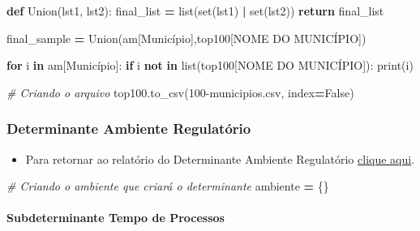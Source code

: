\documentclass[
  12,
  dvipsnames]{article}
\newenvironment{Shaded}{\begin{snugshade}}{\end{snugshade}}
\newcommand{\BuiltInTok}[1]{#1}
\newcommand{\CommentTok}[1]{\textcolor[rgb]{0.56,0.35,0.01}{\textit{#1}}}
\newcommand{\ControlFlowTok}[1]{\textcolor[rgb]{0.13,0.29,0.53}{\textbf{#1}}}
\newcommand{\KeywordTok}[1]{\textcolor[rgb]{0.13,0.29,0.53}{\textbf{#1}}}
\newcommand{\NormalTok}[1]{#1}
\newcommand{\OperatorTok}[1]{\textcolor[rgb]{0.81,0.36,0.00}{\textbf{#1}}}
\newcommand{\StringTok}[1]{\textcolor[rgb]{0.31,0.60,0.02}{#1}}
\newcommand{\VariableTok}[1]{\textcolor[rgb]{0.00,0.00,0.00}{#1}}
\providecommand{\tightlist}{%
  \setlength{\itemsep}{0pt}\setlength{\parskip}{0pt}}
\begin{document}
\begin{Shaded}
\begin{Highlighting}[]
\KeywordTok{def}\NormalTok{ Union(lst1, lst2):}
\NormalTok{    final\_list }\OperatorTok{=} \BuiltInTok{list}\NormalTok{(}\BuiltInTok{set}\NormalTok{(lst1) }\OperatorTok{|} \BuiltInTok{set}\NormalTok{(lst2))}
    \ControlFlowTok{return}\NormalTok{ final\_list}

\NormalTok{final\_sample }\OperatorTok{=}\NormalTok{ Union(am[}\StringTok{\textquotesingle{}Município\textquotesingle{}}\NormalTok{],top100[}\StringTok{\textquotesingle{}NOME DO MUNICÍPIO\textquotesingle{}}\NormalTok{])}

\ControlFlowTok{for}\NormalTok{ i }\KeywordTok{in}\NormalTok{ am[}\StringTok{\textquotesingle{}Município\textquotesingle{}}\NormalTok{]:}
    \ControlFlowTok{if}\NormalTok{ i }\KeywordTok{not} \KeywordTok{in} \BuiltInTok{list}\NormalTok{(top100[}\StringTok{\textquotesingle{}NOME DO MUNICÍPIO\textquotesingle{}}\NormalTok{]):}
        \BuiltInTok{print}\NormalTok{(i)}

\CommentTok{\# Criando o arquivo}
\NormalTok{top100.to\_csv(}\StringTok{\textquotesingle{}100{-}municipios.csv\textquotesingle{}}\NormalTok{, index}\OperatorTok{=}\VariableTok{False}\NormalTok{)}
\end{Highlighting}
\end{Shaded}

\hypertarget{script_2.1}{%
\subsubsection*{Determinante Ambiente Regulatório}\label{script_2.1}}

\begin{itemize}
\tightlist
\item
  Para retornar ao relatório do Determinante Ambiente Regulatório
  \protect\hyperlink{det_amb_regulatorio}{clique aqui}.
\end{itemize}

\begin{Shaded}
\begin{Highlighting}[]
\CommentTok{\# Criando o ambiente que criará o determinante}
\NormalTok{ambiente }\OperatorTok{=}\NormalTok{ \{\}}
\end{Highlighting}
\end{Shaded}

\hypertarget{script_2.1.1}{%
\paragraph*{Subdeterminante Tempo de Processos}\label{script_2.1.1}}
\end{document}
